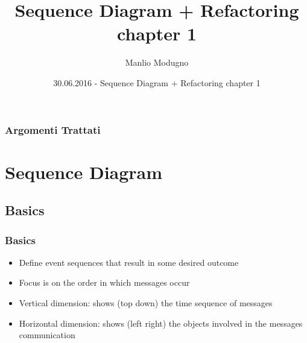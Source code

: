 \documentclass{beamer}
\title{Sequence Diagram + Refactoring chapter 1}
\author{Manlio Modugno}
\institute[GMTechnologies]
\date[30.06.2016] 
{30.06.2016 - Sequence Diagram + Refactoring chapter 1}
\begin{document}
\begin{frame}
  \titlepage
\end{frame}

\begin{frame}
  \frametitle{Argomenti Trattati}
  \tableofcontents
\end{frame}

\section{Sequence Diagram}
\subsection{Basics}
\begin{frame}
  \frametitle{Basics}
  \begin{itemize}
  		\item<+-> Define event sequences that result in some desired outcome
		\item<+-> Focus is on the order in which messages occur
		\item<+-> Vertical dimension: shows (top down) the time sequence of messages
		\item<+-> Horizontal dimension: shows (left right) the objects involved in the messages communication
  \end{itemize}
\end{frame}
\end{document}
